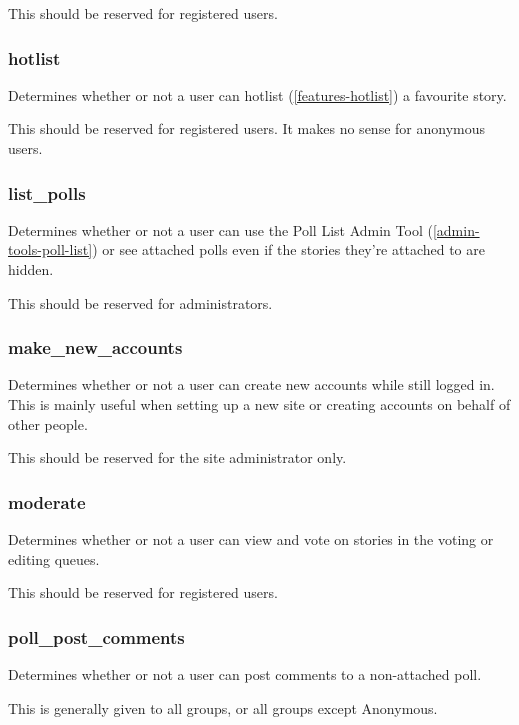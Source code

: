 This should be reserved for registered users.

\subsubsection{hotlist}
\label{perm-hotlist}

Determines whether or not a user can hotlist (\ref{features-hotlist}) a favourite story.

This should be reserved for registered users.  It makes no sense for anonymous users.

\subsubsection{list\_polls}
\label{perm-list-polls}

Determines whether or not a user can use the Poll List Admin Tool (\ref{admin-tools-poll-list}) or see attached polls even if the stories they're attached to are hidden.

This should be reserved for administrators.

\subsubsection{make\_new\_accounts}
\label{perm-make-new-accounts}

Determines whether or not a user can create new accounts while still logged in. This is mainly useful when setting up a new site or creating accounts on behalf of other people.

This should be reserved for the site administrator only.

\subsubsection{moderate}
\label{perm-moderate}

Determines whether or not a user can view and vote on stories in the voting or editing queues.

This should be reserved for registered users.

\subsubsection{poll\_post\_comments}
\label{perm-poll-post-comments}

Determines whether or not a user can post comments to a non-attached poll.

This is generally given to all groups, or all groups except Anonymous.

